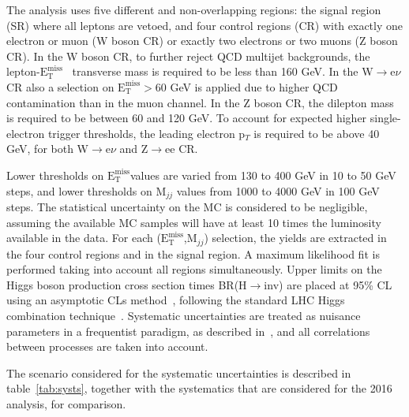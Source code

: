 \documentclass[../report.tex]{subfiles}
\newcommand{\MET}{\ensuremath{\mathrm{E}_{\mathrm{T}}^{\mathrm{miss}}}}
\begin{document}
The analysis uses five different and non-overlapping regions: the
signal region (SR) where all leptons are vetoed, and four control
regions (CR) with exactly one electron or muon (W boson CR) or exactly
two electrons or two muons (Z boson CR). In the W boson CR, to further
reject QCD multijet backgrounds, the lepton-\MET~ transverse mass is
required to be less than 160 GeV. In the W$\rightarrow$e$\nu$ CR also
a selection on \MET$>60$ GeV is applied due to higher QCD
contamination than in the muon channel. In the Z boson CR, the
dilepton mass is required to be between 60 and 120 GeV. To account for
expected higher single-electron trigger thresholds, the leading
electron p$_T$ is required to be above 40 GeV, for both
W$\rightarrow$e$\nu$ and Z$\rightarrow$ee CR.

Lower thresholds on \MET values are varied from 130 to 400 GeV in 10
to 50 GeV steps, and lower thresholds on M$_{jj}$ values from 1000 to
4000 GeV in 100 GeV steps. The statistical uncertainty on the MC is
considered to be negligible, assuming the available MC samples will
have at least 10 times the luminosity available in the data.  For each
(\MET,M$_{jj}$) selection, the yields are extracted in the four
control regions and in the signal region. A maximum likelihood fit is
performed taking into account all regions simultaneously. Upper limits
on the Higgs boson production cross section times
BR(H$\rightarrow$inv) are placed at 95\% CL using an asymptotic CLs
method~\cite{Read1,junkcls,Dittmaier:2012vm}, following the standard
LHC Higgs combination
technique~\cite{Chatrchyan:2013lba,ATLAS:2011tau}. Systematic
uncertainties are treated as nuisance parameters in a frequentist
paradigm, as described in~\cite{ATLAS:2011tau}, and all
correlations between processes are taken into account.

The scenario considered for the systematic uncertainties is described
in table~\ref{tab:systs}, together with the systematics that are
considered for the 2016 analysis, for comparison.
\end{document}
